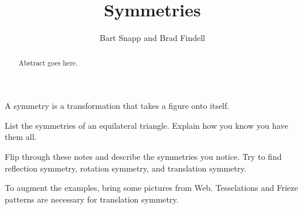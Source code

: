 \documentclass{ximera}
\title{Symmetries}
\author{Bart Snapp and Brad Findell}
\begin{document}
\begin{abstract}
Abstract goes here.  
\end{abstract}
\maketitle

\begin{teachingnote}
\end{teachingnote}

\begin{definition}
A symmetry is a transformation that takes a figure onto itself.  
\end{definition}
\begin{problem}
List the symmetries of an equilateral triangle.  Explain how you know you have them all.  
\end{problem}

\begin{problem}
Flip through these notes and describe the symmetries you notice.  Try to find reflection symmetry, rotation symmetry, and translation symmetry.  
\end{problem}

\begin{teachingnote}
To augment the examples, bring some pictures from Web.   Tesselations and Frieze patterns are necessary for translation symmetry.  
\end{teachingnote}
\end{document}

